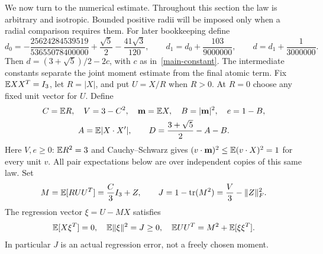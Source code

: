 We now turn to the numerical estimate. Throughout this section the law
is arbitrary and isotropic. Bounded positive radii will be imposed only
when a radial comparison requires them. For later bookkeeping define
\begin{equation}\label{constants}
 d_0=-\frac{25624284539519}{53655078400000}
                  +\frac{\sqrt5}{2}-\frac{41\sqrt3}{120},\qquad
 d_1=d_0+\frac{103}{9000000},\qquad
 d=d_1+\frac1{3000000}.
\end{equation}
Then $d=(3+\sqrt5)/2-2c$, with $c$ as in~\eqref{main-constant}.
The intermediate constants separate the joint moment estimate from
the final atomic term.
Fix $\mathbb E XX^T=I_3$, let $R=|X|$, and put $U=X/R$ when $R>0$.
At $R=0$ choose any fixed unit vector for $U$. Define
\[
 \begin{gathered}
 C=\mathbb E R,\quad V=3-C^2,\quad \mathbf m=\mathbb E X,\quad B=|\mathbf m|^2,\quad e=1-B,\\
 A=\mathbb E|X\cdot X'|,\qquad D=\frac{3+\sqrt5}{2}-A-B.
 \end{gathered}
\]
Here $V,e\ge0$: $\mathbb E R^2=3$ and Cauchy--Schwarz gives
$(v\cdot \mathbf m)^2\le\mathbb E(v\cdot X)^2=1$ for every unit $v$.
All pair expectations below are over independent copies of this same law.
Set
\[
 M=\mathbb E[R UU^T]=\frac C3I_3+Z,\qquad
 J=1-\operatorname{tr}(M^2)=\frac V3-\|Z\|_F^2.
\]
The regression vector $\xi=U-MX$ satisfies
\begin{equation}\label{regression}
 \mathbb E[X\xi^T]=0,\quad \mathbb E\|\xi\|^2=J\ge0,\quad
 \mathbb E UU^T=M^2+\mathbb E[\xi\xi^T].
\end{equation}
In particular $J$ is an actual regression error, not a freely chosen moment.

